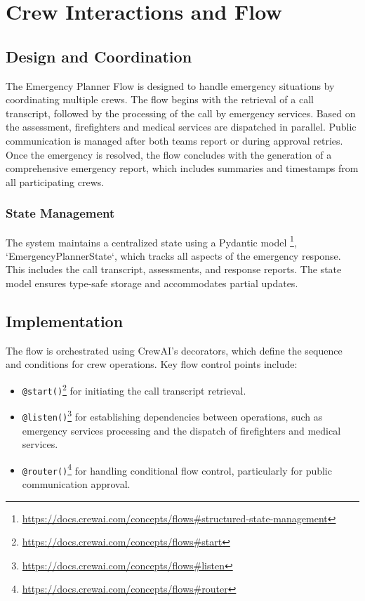 \section{Crew Interactions and Flow}
\label{sec:crew_interaction}

\subsection{Design and Coordination}
The Emergency Planner Flow is designed to handle emergency situations by coordinating multiple crews. The flow begins with the retrieval of a call transcript, followed by the processing of the call by emergency services. Based on the assessment, firefighters and medical services are dispatched in parallel. Public communication is managed after both teams report or during approval retries. Once the emergency is resolved, the flow concludes with the generation of a comprehensive emergency report, which includes summaries and timestamps from all participating crews.

\subsubsection{State Management}
The system maintains a centralized state using a Pydantic model \footnote{\url{https://docs.crewai.com/concepts/flows\#structured-state-management}}, `EmergencyPlannerState`, which tracks all aspects of the emergency response. This includes the call transcript, assessments, and response reports. The state model ensures type-safe storage and accommodates partial updates.

\subsection{Implementation}
The flow is orchestrated using CrewAI's decorators, which define the sequence and conditions for crew operations. Key flow control points include:

\begin{itemize}
    \item \texttt{@start()}\footnote{\url{https://docs.crewai.com/concepts/flows\#start}} for initiating the call transcript retrieval.
    \item \texttt{@listen()}\footnote{\url{https://docs.crewai.com/concepts/flows\#listen}} for establishing dependencies between operations, such as emergency services processing and the dispatch of firefighters and medical services.
    \item \texttt{@router()}\footnote{\url{https://docs.crewai.com/concepts/flows\#router}} for handling conditional flow control, particularly for public communication approval.
\end{itemize}



